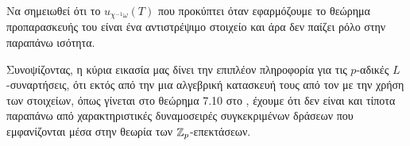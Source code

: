 \noindent Να σημειωθεί ότι το $u_{\chi^{-1}\omega}(T)$ που προκύπτει όταν εφαρμόζουμε το θεώρημα προπαρασκευής του  είναι ένα αντιστρέψιμο στοιχείο και άρα δεν παίζει ρόλο στην παραπάνω ισότητα.

Συνοψίζοντας, η κύρια εικασία μας δίνει την επιπλέον πληροφορία για τις $p$-αδικές $L$-συναρτήσεις, ότι εκτός 
από την μια αλγεβρική κατασκευή τους από τον  με την χρήση των  στοιχείων, όπως γίνεται 
στο θεώρημα 7.10 στο \cite{Wash}, έχουμε ότι δεν είναι και τίποτα παραπάνω από χαρακτηριστικές δυναμοσειρές συγκεκριμένων δράσεων  που εμφανίζονται μέσα στην θεωρία των $\mathbb{Z}_p$-επεκτάσεων.




